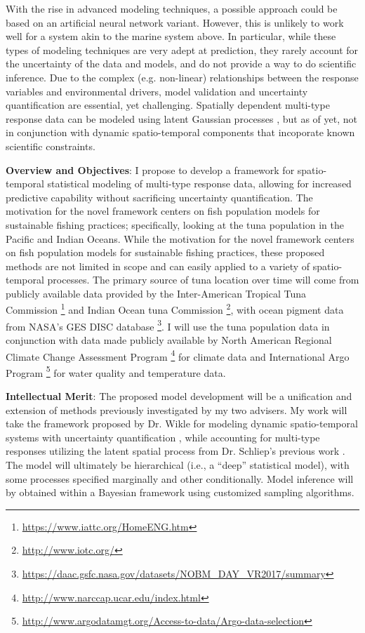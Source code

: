 \documentclass[12pt]{article}
\begin{document}
With the rise in advanced modeling techniques, a possible approach could be based on an artificial neural network variant. However, this is unlikely to work well for a system akin to the marine system above. In particular, while these types of modeling techniques are very adept at prediction, they rarely account for the uncertainty of the data and models, and do not provide a way to do scientific inference. Due to the complex (e.g. non-linear) relationships between the response variables and environmental drivers, model validation and uncertainty quantification are essential, yet challenging. Spatially dependent multi-type response data can be modeled using latent Gaussian processes \citep{schliep}, but as of yet, not in conjunction with dynamic spatio-temporal components that incoporate known scientific constraints.


\vspace{2mm}

\noindent \textbf{Overview and Objectives}: I propose to develop a framework for spatio-temporal statistical modeling of multi-type response data, allowing for increased predictive capability without sacrificing uncertainty quantification. The motivation for the novel framework centers on fish population models for sustainable fishing practices; specifically, looking at the tuna population in the Pacific and Indian Oceans. While the motivation for the novel framework centers on fish population models for sustainable fishing practices, these proposed methods are not limited in scope and can easily applied to a variety of spatio-temporal processes. The primary source of tuna location over time will come from publicly available data provided by the Inter-American Tropical Tuna Commission \footnote{\url{https://www.iattc.org/HomeENG.htm}} and Indian Ocean tuna Commission \footnote{\url{http://www.iotc.org/}}, with ocean pigment data from NASA's GES DISC database \footnote{\url{https://daac.gsfc.nasa.gov/datasets/NOBM_DAY_VR2017/summary}}. I will use the tuna population data in conjunction with data made publicly available by North American Regional Climate Change Assessment Program \footnote{\url{http://www.narccap.ucar.edu/index.html}} for climate data and International Argo Program \footnote{\url{http://www.argodatamgt.org/Access-to-data/Argo-data-selection}} for water quality and temperature data.


\vspace{2mm}

\noindent \textbf{Intellectual Merit}: 
The proposed model development will be a unification and extension of methods previously investigated by my two advisers. My work will take the framework proposed by Dr. Wikle for modeling dynamic spatio-temporal systems with uncertainty quantification \citep{wikle_2017, cressie_wikle_2011}, while accounting for multi-type responses utilizing the latent spatial process from Dr. Schliep's previous work \citep{schliep}. The model will ultimately be hierarchical (i.e., a ``deep'' statistical model), with some processes specified marginally and other conditionally. Model inference will by obtained within a Bayesian framework using customized sampling algorithms.
\end{document}
